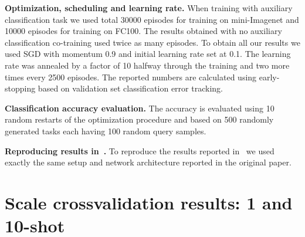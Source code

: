 \documentclass{article}
\begin{document}
\textbf{Optimization, scheduling and learning rate.} When training with auxiliary classification task we used total 30000 episodes for training on mini-Imagenet and 10000 episodes for training on FC100. The results obtained with no auxiliary classification co-training used twice as many episodes. To obtain all our results we used SGD with momentum 0.9 and initial learning rate set at 0.1. The learning rate was annealed by a factor of 10 halfway through the training and two more times every 2500 episodes. The reported numbers are calculated using early-stopping based on validation set classification error tracking.

\textbf{Classification accuracy evaluation.} The accuracy is evaluated using 10 random restarts of the optimization procedure and based on 500 randomly generated tasks each having 100 random query samples.

\textbf{Reproducing results in~\citep{snell2017prototypical}.} To reproduce the results reported in~\citep{snell2017prototypical} we used exactly the same setup and network architecture reported in the original paper.







\iffalse

\section{Scale crossvalidation results: 1 and 10-shot} \label{sec:one_shot_alpha_results}
\end{document}
